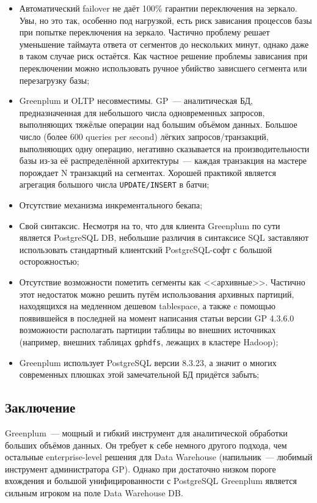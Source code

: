 \begin{itemize}
  \item Автоматический failover не даёт 100\% гарантии переключения на зеркало. Увы, но это так, особенно под нагрузкой, есть риск зависания процессов базы при попытке переключения на зеркало. Частично проблему решает уменьшение таймаута ответа от сегментов до нескольких минут, однако даже в таком случае риск остаётся. Как частное решение проблемы зависания при переключении можно использовать ручное убийство зависшего сегмента или перезагрузку базы;
  \item Greenplum и OLTP несовместимы. GP~--- аналитическая БД, предназначенная для небольшого числа одновременных запросов, выполняющих тяжёлые операции над большим объёмом данных. Большое число (более 600 queries per second) лёгких запросов/транзакций, выполняющих одну операцию, негативно сказывается на производительности базы из-за её распределённой архитектуры~--- каждая транзакция на мастере порождает N транзакций на сегментах. Хорошей практикой является агрегация большого числа \lstinline!UPDATE/INSERT! в батчи;
  \item Отсутствие механизма инкрементального бекапа;
  \item Свой синтаксис. Несмотря на то, что для клиента Greenplum по сути является PostgreSQL DB, небольшие различия в синтаксисе SQL заставляют использовать стандартный клиентский PostgreSQL-софт с большой осторожностью;
  \item Отсутствие возможности пометить сегменты как <<архивные>>. Частично этот недостаток можно решить путём использования архивных партиций, находящихся на медленном дешевом tablespace, а также c помощью появившейся в последней на момент написания статьи версии GP 4.3.6.0 возможности располагать партиции таблицы во внешних источниках (например, внешних таблицах \lstinline!gphdfs!, лежащих в кластере Hadoop);
  \item Greenplum использует PostgreSQL версии 8.3.23, а значит о многих современных плюшках этой замечательной БД придётся забыть;
\end{itemize}


\subsection{Заключение}

Greenplum~--- мощный и гибкий инструмент для аналитической обработки больших объёмов данных. Он требует к себе немного другого подхода, чем остальные enterprise-level решения для Data Warehouse (напильник~--- любимый инструмент администратора GP). Однако при достаточно низком пороге вхождения и большой унифицированности с PostgreSQL Greenplum является сильным игроком на поле Data Warehouse DB.

